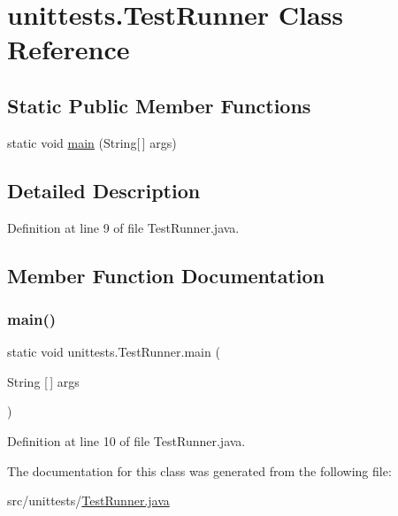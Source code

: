 \hypertarget{classunittests_1_1_test_runner}{}\section{unittests.\+Test\+Runner Class Reference}
\label{classunittests_1_1_test_runner}
\subsection*{Static Public Member Functions}
\begin{DoxyCompactItemize}
\item 
static void \hyperlink{classunittests_1_1_test_runner_a841d96bab611e0ceeaf85d3fdabbe7a5}{main} (String\mbox{[}$\,$\mbox{]} args)
\end{DoxyCompactItemize}


\subsection{Detailed Description}


Definition at line 9 of file Test\+Runner.\+java.



\subsection{Member Function Documentation}
\hypertarget{classunittests_1_1_test_runner_a841d96bab611e0ceeaf85d3fdabbe7a5}{}\label{classunittests_1_1_test_runner_a841d96bab611e0ceeaf85d3fdabbe7a5} 
\subsubsection{\texorpdfstring{main()}{main()}}
{\footnotesize\ttfamily static void unittests.\+Test\+Runner.\+main (\begin{DoxyParamCaption}\item[{String \mbox{[}$\,$\mbox{]}}]{args }\end{DoxyParamCaption})\hspace{0.3cm}{\ttfamily [static]}}



Definition at line 10 of file Test\+Runner.\+java.



The documentation for this class was generated from the following file\+:\begin{DoxyCompactItemize}
\item 
src/unittests/\hyperlink{_test_runner_8java}{Test\+Runner.\+java}\end{DoxyCompactItemize}
